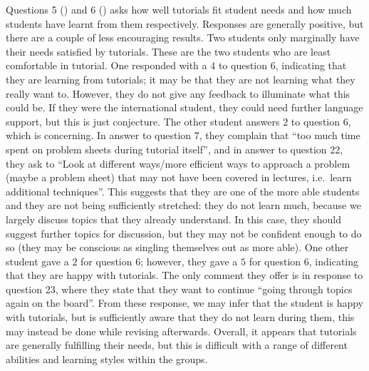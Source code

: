 Questions 5 () and 6 () asks how well tutorials fit student needs and how much students have learnt from them respectively. Responses are generally positive, but there are a couple of less encouraging results. Two students only marginally have their needs satisfied by tutorials. These are the two students who are least comfortable in tutorial. One responded with a $4$ to question 6, indicating that they are learning from tutorials; it may be that they are not learning what they really want to. However, they do not give any feedback to illuminate what this could be. If they were the international student, they could need further language support, but this is just conjecture. The other student answers $2$ to question 6, which is concerning. In answer to question 7, they complain that ``too much time spent on problem sheets during tutorial itself'', and in answer to question 22, they ask to ``Look at different ways/more efficient ways to approach a problem (maybe a problem sheet) that may not have been covered in lectures, i.e.\ learn additional techniques''. This suggests that they are one of the more able students and they are not being sufficiently stretched: they do not learn much, because we largely discuss topics that they already understand. In this case, they should suggest further topics for discussion, but they may not be confident enough to do so (they may be conscious as singling themselves out as more able). One other student gave a $2$ for question 6; however, they gave a $5$ for question 6, indicating that they are happy with tutorials. The only comment they offer is in response to question 23, where they state that they want to continue ``going through topics again on the board''. From these response, we may infer that the student is happy with tutorials, but is sufficiently aware that they do not learn during them, this may instead be done while revising afterwards. Overall, it appears that tutorials are generally fulfilling their needs, but this is difficult with a range of different abilities and learning styles within the groups.

